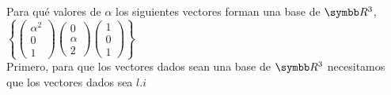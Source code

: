 \item Para qué valores de \(\alpha\) los siguientes vectores forman una base de \(\realR^3\), 
    \(
        \left\{
            \left(\begin{smallmatrix}\alpha^2 \\ 0 \\ 1\end{smallmatrix}\right)
            \left(\begin{smallmatrix} 0 \\ \alpha \\ 2 \end{smallmatrix}\right)
            \left(\begin{smallmatrix}1 \\ 0 \\ 1\end{smallmatrix}\right)
        \right\}
    \) \\
    Primero, para que los vectores dados sean una base de \(\realR^3\) necesitamos que los vectores dados sea \(l.i\)
